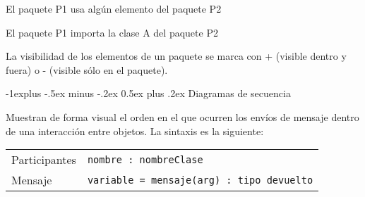 \documentclass[10pt,a4paper,landscape]{article}
\makeatletter
\renewcommand{\subsection}{\@startsection{subsection}{2}{0mm}%
                                {-1explus -.5ex minus -.2ex}%
                                {0.5ex plus .2ex}%
                                {\normalfont\normalsize\bfseries}}
\makeatother
\begin{document}
\begin{multicols}{3}
\hskip 4pt \parbox{4cm}{
   El paquete P1 usa algún elemento del paquete P2
 }

\hskip 4pt \parbox{3cm}{
   El paquete P1 importa la clase A del paquete P2
 }

 La visibilidad de los elementos de un paquete se marca con + (visible dentro y
 fuera) o - (visible sólo en el paquete).

 \subsection{Diagramas de secuencia}

  Muestran de forma visual el orden en el que ocurren los envíos de mensaje
 dentro de una interacción entre objetos. La sintaxis es la siguiente:

 \begin{tabular}{@{}ll@{}}
Participantes & \texttt{nombre : nombreClase} \\
Mensaje  & \texttt{variable = mensaje(arg) : tipo devuelto} \\
\end{tabular}



\end{multicols}
\end{document}
